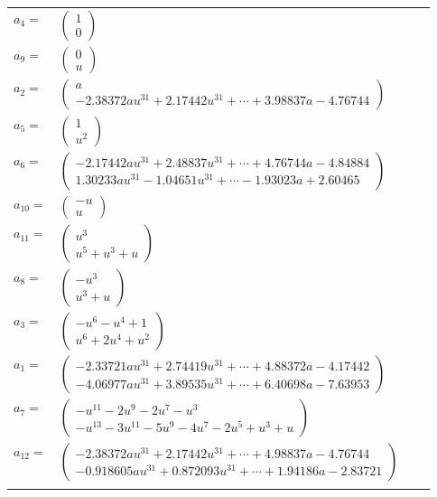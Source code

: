 \documentclass[1p]{elsarticle_modified}
\theoremstyle{definition}
\begin{document}
\begin{tabular}{m{7pt} m{180pt} m{7pt} m{180pt} }
\flushright $a_{4}=$&$\begin{pmatrix}1\\0\end{pmatrix}$ \\
\flushright $a_{9}=$&$\begin{pmatrix}0\\u\end{pmatrix}$ \\
\flushright $a_{2}=$&$\begin{pmatrix}a\\-2.38372 a u^{31}+2.17442 u^{31}+\cdots+3.98837 a-4.76744\end{pmatrix}$ \\
\flushright $a_{5}=$&$\begin{pmatrix}1\\u^2\end{pmatrix}$ \\
\flushright $a_{6}=$&$\begin{pmatrix}-2.17442 a u^{31}+2.48837 u^{31}+\cdots+4.76744 a-4.84884\\1.30233 a u^{31}-1.04651 u^{31}+\cdots-1.93023 a+2.60465\end{pmatrix}$ \\
\flushright $a_{10}=$&$\begin{pmatrix}- u\\u\end{pmatrix}$ \\
\flushright $a_{11}=$&$\begin{pmatrix}u^3\\u^5+u^3+u\end{pmatrix}$ \\
\flushright $a_{8}=$&$\begin{pmatrix}- u^3\\u^3+u\end{pmatrix}$ \\
\flushright $a_{3}=$&$\begin{pmatrix}- u^6- u^4+1\\u^6+2 u^4+u^2\end{pmatrix}$ \\
\flushright $a_{1}=$&$\begin{pmatrix}-2.33721 a u^{31}+2.74419 u^{31}+\cdots+4.88372 a-4.17442\\-4.06977 a u^{31}+3.89535 u^{31}+\cdots+6.40698 a-7.63953\end{pmatrix}$ \\
\flushright $a_{7}=$&$\begin{pmatrix}- u^{11}-2 u^9-2 u^7- u^3\\- u^{13}-3 u^{11}-5 u^9-4 u^7-2 u^5+u^3+u\end{pmatrix}$ \\
\flushright $a_{12}=$&$\begin{pmatrix}-2.38372 a u^{31}+2.17442 u^{31}+\cdots+4.98837 a-4.76744\\-0.918605 a u^{31}+0.872093 u^{31}+\cdots+1.94186 a-2.83721\end{pmatrix}$\\&\end{tabular}
\end{document}
